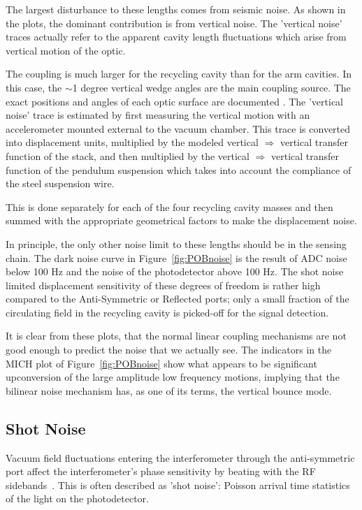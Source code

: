 The largest disturbance to these lengths comes from seismic noise. As
shown in the plots, the dominant contribution is from vertical noise.
The 'vertical noise' traces actually refer to the apparent cavity
length fluctuations which arise from vertical motion of the optic.

The coupling is much larger for the recycling cavity than for the
arm cavities. In this case, the $\sim$1 degree vertical wedge angles
are the main coupling source. The exact positions and angles
of each optic surface are documented \cite{Dennis:WedgeAngles}. The
'vertical noise' trace is estimated by first measuring the vertical
motion with an accelerometer mounted external to the vacuum chamber.
This trace is converted into displacement units, multiplied by
the modeled vertical $\Rightarrow$ vertical transfer function of the 
stack, and then multiplied by the vertical $\Rightarrow$ vertical transfer function 
of the pendulum suspension which takes into account the compliance 
of the steel suspension wire.

This is done separately for each of the four recycling cavity masses and
then summed with the appropriate geometrical factors to make the displacement
noise.

In principle, the only other noise limit to these lengths should be
in the sensing chain. The dark noise curve in Figure~\ref{fig:POBnoise}
is the result of ADC noise below 100 Hz and the noise of the photodetector
above 100 Hz. The shot noise limited displacement sensitivity of these
degrees of freedom is rather high compared to the Anti-Symmetric or
Reflected ports; only a small fraction
of the circulating field  in the recycling cavity is picked-off for the 
signal detection.

It is clear from these plots, that the normal linear coupling mechanisms
are not good enough to predict the noise that we actually see. The 
indicators in the MICH plot of Figure~\ref{fig:POBnoise} show what appears
to be significant upconversion of the large amplitude low frequency 
motions, implying that the bilinear noise mechanism has, as one of its
terms, the vertical bounce mode.



\subsection{Shot Noise}
\label{sec:ShotNoise}

Vacuum field fluctuations entering the interferometer through the
anti-symmetric port affect the interferometer's phase sensitivity
by beating with the RF sidebands~\cite{Caves:RadPress,Caves:Squeezing}. 
This is often described
as 'shot noise': Poisson arrival time statistics of the light
on the photodetector.

